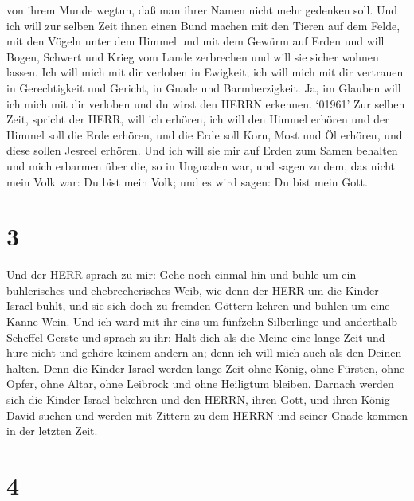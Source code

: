 von ihrem Munde wegtun, daß man ihrer Namen nicht mehr gedenken soll.
 Und ich will zur selben Zeit ihnen einen Bund machen mit
den Tieren auf dem Felde, mit den Vögeln unter dem Himmel und mit dem
Gewürm auf Erden und will Bogen, Schwert und Krieg vom Lande zerbrechen
und will sie sicher wohnen lassen.  Ich will mich mit dir
verloben in Ewigkeit; ich will mich mit dir vertrauen in Gerechtigkeit
und Gericht, in Gnade und Barmherzigkeit.  Ja, im Glauben
will ich mich mit dir verloben und du wirst den HERRN erkennen.
 `01961' Zur selben Zeit, spricht der HERR, will ich
erhören, ich will den Himmel erhören und der Himmel soll die Erde
erhören,  und die Erde soll Korn, Most und Öl erhören, und
diese sollen Jesreel erhören.  Und ich will sie mir auf
Erden zum Samen behalten und mich erbarmen über die, so in Ungnaden war,
und sagen zu dem, das nicht mein Volk war: Du bist mein Volk; und es
wird sagen: Du bist mein Gott.

\hypertarget{section-2}{%
\section{3}\label{section-2}}

 Und der HERR sprach zu mir: Gehe noch einmal hin und buhle
um ein buhlerisches und ehebrecherisches Weib, wie denn der HERR um die
Kinder Israel buhlt, und sie sich doch zu fremden Göttern kehren und
buhlen um eine Kanne Wein.  Und ich ward mit ihr eins um
fünfzehn Silberlinge und anderthalb Scheffel Gerste  und
sprach zu ihr: Halt dich als die Meine eine lange Zeit und hure nicht
und gehöre keinem andern an; denn ich will mich auch als den Deinen
halten.  Denn die Kinder Israel werden lange Zeit ohne
König, ohne Fürsten, ohne Opfer, ohne Altar, ohne Leibrock und ohne
Heiligtum bleiben.  Darnach werden sich die Kinder Israel
bekehren und den HERRN, ihren Gott, und ihren König David suchen und
werden mit Zittern zu dem HERRN und seiner Gnade kommen in der letzten
Zeit.

\hypertarget{section-3}{%
\section{4}\label{section-3}}

